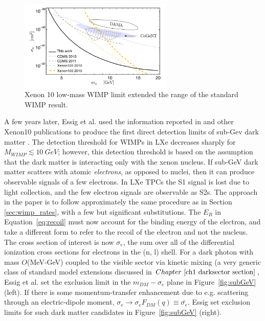 \begin{figure}[htbp]
\begin{center}
\includegraphics[width=0.65\textwidth]{figures/lxetpcs/xenon10lowmass.png}
\caption{Xenon 10 low-mass WIMP limit extended the range of the standard WIMP result. }
\label{fig:xenon10lowmass}
\end{center}
\end{figure}


A few years later, Essig et al. used the information reported in \cite{Angle2011} and other Xenon10 publications to produce the first direct detection limits of sub-Gev dark matter \cite{Essig2012}. The detection threshold for \ac{WIMP}s in \ac{LXe} decreases sharply for $M_{WIMP} \lesssim 10~GeV$; however, this detection threshold is based on the assumption that the dark matter is interacting only with the xenon nucleus. If sub-GeV dark matter scatters with atomic \textit{electrons}, as opposed to nuclei, then it can produce observable signals of a few electrons. In \ac{LXe} \ac{TPC}s the S1 signal is lost due to light collection, and the few electron signals are observable as S2s. The approach in the paper is to follow approximately the same procedure as in Section~ \ref{sec:wimp_rates}, with a few but significant substitutions. The $E_{R}$ in Equation~\ref{eq:recoil} must now account for the binding energy of the electron, and take a different form to refer to the recoil of the electron and not the nucleus. The cross section of interest is now $\sigma_{e}$, the sum over all of the differential ionization cross sections for electrons in the (n, l) shell. For a dark photon with mass $O$(MeV-GeV) coupled to the visible sector via kinetic mixing (a very generic class of standard model extensions discussed in $Chapter~\ref{ch1 darksector section}$, Essig et al. set the exclusion limit in the $m_{DM}-\sigma_{e}$ plane in Figure~\ref{fig:subGeV} (left). If there is some momentum-transfer enhancement due to e.g. scattering through an electric-dipole moment, $\sigma_{e} \longrightarrow \sigma_{e}F_{DM}(q) \equiv \bar{\sigma_{e}}$. Essig set exclusion limits for such dark matter candidates in Figure~\ref{fig:subGeV} (right).



